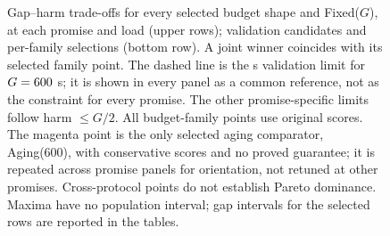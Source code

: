 \begin{figure}[p]
{}
\caption{Gap--harm trade-offs for every selected budget shape and Fixed($G$), at each
promise and load (upper rows); validation candidates and per-family selections
(bottom row). A joint winner coincides with its selected family point. The dashed
line is the  s validation limit for $G=600$ s; it is shown in
every panel as a common reference, not as the constraint for every promise.
The other promise-specific limits follow harm $\le G/2$.
All budget-family points use original scores. The magenta point is the only selected
aging comparator, Aging(600), with conservative scores and no proved guarantee;
it is repeated across promise panels for orientation, not retuned at other promises.
Cross-protocol points do not establish Pareto dominance. Maxima have no population
interval; gap intervals for the selected rows are reported in the tables.}
\label{fig:gap_harm}
\end{figure}
